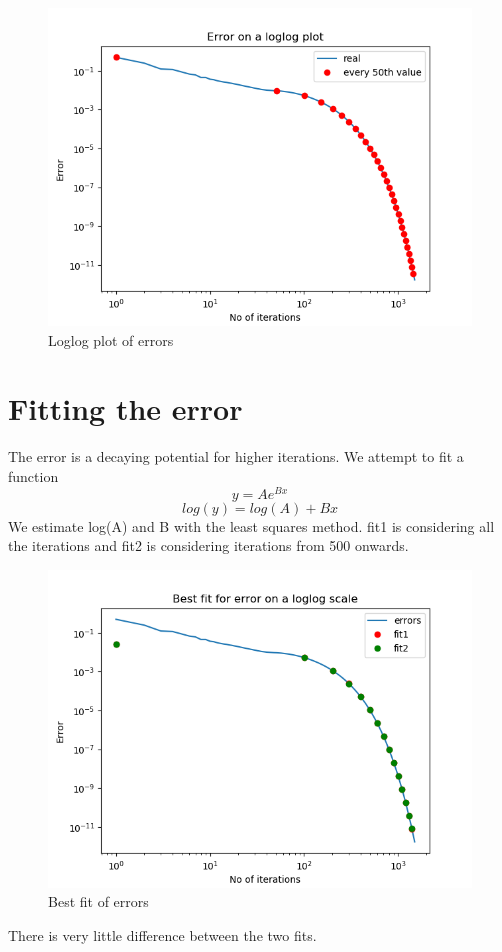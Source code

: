 \documentclass[11pt, a4paper]{article}
\begin{document}
   \begin{figure}[!tbh]
   	\centering
   	\includegraphics[scale=0.5]{fig2.png}  %
   	\caption{Loglog plot of errors}
   	\label{fig:sample}
   \end{figure} 
   
 
\section{Fitting the error}
The error is a decaying potential for higher iterations. We attempt to fit a function 
\begin{equation}
y = Ae^{Bx}
\end{equation}
\begin{equation}
log(y) = log(A) + Bx
\end{equation}
We estimate log(A) and B with the least squares method.
fit1 is considering all the iterations and fit2 is considering iterations from 500 onwards.
\begin{figure}[!tbh]
   	\centering
   	\includegraphics[scale=0.5]{fig3.png}  %
   	\caption{Best fit of errors}
   	\label{fig:sample}
   \end{figure} 
   There is very little difference between the two fits.
   
\end{document}
